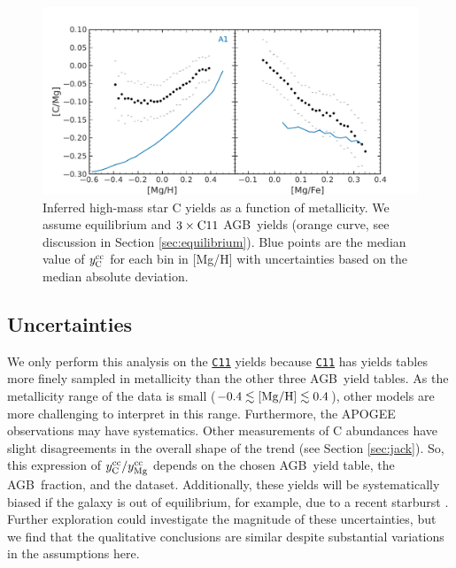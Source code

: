 \documentclass[fleqn,usenatbib]{mnras}
\newcommand{\cxi}{\texttt{\hyperlink{C11}{C11}}}
\newcommand{\agb}{AGB}
\newcommand{\apogee}{APOGEE}
\newcommand{\Ycc}{\ensuremath{y_{\rm C}^{\rm cc}}}
\newcommand{\Yoc}{\ensuremath{y_{\rm Mg}^{\rm cc}}}
\begin{document}
\begin{figure}
    \centering
    \includegraphics[width=\columnwidth]{analytic.pdf}
    \caption[Reverse-Fit Yields]{Inferred high-mass star C yields as a function of metallicity. We assume equilibrium and $3\times {\rm C11}$ \agb\ yields (orange curve, see discussion in Section \ref{sec:equilibrium}). Blue points are the median value of $\Ycc$ for each bin in [Mg/H] with uncertainties based on the median absolute deviation.
    }
    \label{fig:analytic}
\end{figure}





\subsection{Uncertainties}

We only perform this analysis on the \cxi{} yields because \cxi{} has yields tables more finely sampled in metallicity than the other three \agb\ yield tables. As the metallicity range of the data is small ($-0.4\lesssim {\rm [Mg/H]} \lesssim 0.4$), other models are more challenging to interpret in this range. Furthermore, the \apogee{} observations may have systematics. Other measurements of C abundances \citep[e.g.][]{vincenzo+21} have slight disagreements in the overall shape of the trend (see Section \ref{sec:jack}).
So, this expression of $\Ycc/\Yoc$ depends on the chosen \agb\ yield table, the \agb\ fraction, and the dataset. 
Additionally, these yields will be systematically biased if the galaxy is out of equilibrium, for example, due to a recent starburst \citep{mor+19,isern19}. Further exploration could investigate the magnitude of these uncertainties, but we find that the qualitative conclusions are similar despite substantial variations in the assumptions here.
\end{document}
